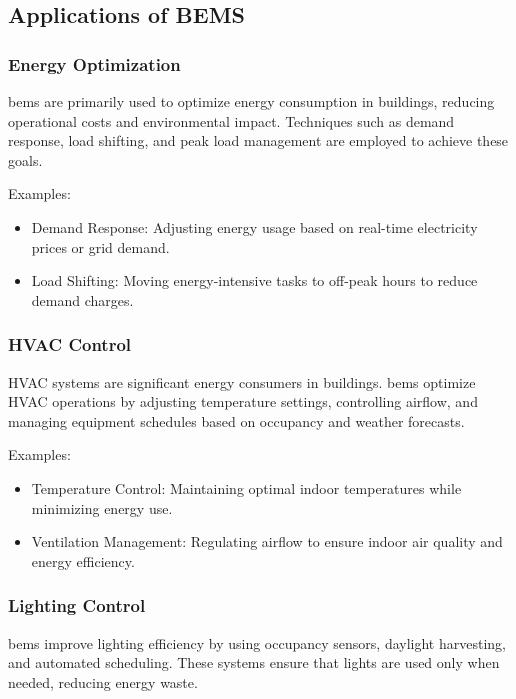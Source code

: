 \subsection*{Applications of BEMS}

\subsubsection*{Energy Optimization}

\gls{bems} are primarily used to optimize energy consumption in buildings, reducing operational costs and environmental impact. Techniques such as demand response, load shifting, and peak load management are employed to achieve these goals.

Examples:
\begin{itemize}
    \item Demand Response: Adjusting energy usage based on real-time electricity prices or grid demand.
    \item Load Shifting: Moving energy-intensive tasks to off-peak hours to reduce demand charges.
\end{itemize}

\subsubsection*{HVAC Control}

HVAC systems are significant energy consumers in buildings. \gls{bems} optimize HVAC operations by adjusting temperature settings, controlling airflow, and managing equipment schedules based on occupancy and weather forecasts.

Examples:
\begin{itemize}
    \item Temperature Control: Maintaining optimal indoor temperatures while minimizing energy use.
    \item Ventilation Management: Regulating airflow to ensure indoor air quality and energy efficiency.
\end{itemize}

\subsubsection*{Lighting Control}

\gls{bems} improve lighting efficiency by using occupancy sensors, daylight harvesting, and automated scheduling. These systems ensure that lights are used only when needed, reducing energy waste.


